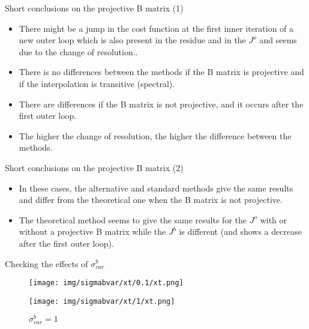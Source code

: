 \documentclass[francais]{beamer}
\begin{document}
\begin{frame}{Short conclusions on the projective B matrix (1)}
\begin{center}
\begin{itemize}
 \item There might be a jump in the cost function at the first inner iteration of a new outer loop which is also present in the residue and in the $J^o$ and seems due to the change of resolution..\\   
 \item There is no differences between the methods if the B matrix is projective and if the interpolation is transitive (spectral).\\
 \item There are differences if the B matrix is not projective, and it occurs after the first outer loop.\\
 \item The higher the change of resolution, the higher the difference between the methods.\\
\end{itemize}
\end{center}
\end{frame}

\begin{frame}{Short conclusions on the projective B matrix (2)}
\begin{center}
\begin{itemize}
 \item In these cases, the alternative and standard methods give the same results and differ from the theoretical one when the B matrix is not projective.\\
 \item The theoretical method seems to give the same results for the $J^o$ with or without a projective B matrix while the $J^b$ is different (and shows a decrease after the first outer loop).
\end{itemize}
\end{center}
\end{frame}

\begin{frame}{Checking the effects of $\sigma^b_{var}$}
\begin{center}
\begin{figure}
  \texttt{[image: img/sigmabvar/xt/0.1/xt.png]}
  \caption{$\sigma^b_{var} = 0.1$}
\endminipage\hfill
{}
  \texttt{[image: img/sigmabvar/xt/1/xt.png]}
  \caption{$\sigma^b_{var} = 1$}
\endminipage
\end{figure}
\end{center}
\end{frame}
\end{document}
